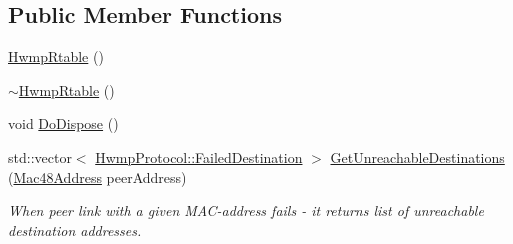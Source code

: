 \subsection*{Public Member Functions}
\begin{DoxyCompactItemize}
\item 
\hyperlink{classns3_1_1dot11s_1_1HwmpRtable_a4b0f3a93997a0308686ba5dee6d5eace}{Hwmp\+Rtable} ()
\item 
\hyperlink{classns3_1_1dot11s_1_1HwmpRtable_a64bd4db0b80a555551dd11f5527a22ee}{$\sim$\+Hwmp\+Rtable} ()
\item 
void \hyperlink{classns3_1_1dot11s_1_1HwmpRtable_a1f8f38d223332a4b95cbad863d809d37}{Do\+Dispose} ()
\item 
std\+::vector$<$ \hyperlink{structns3_1_1dot11s_1_1HwmpProtocol_1_1FailedDestination}{Hwmp\+Protocol\+::\+Failed\+Destination} $>$ \hyperlink{classns3_1_1dot11s_1_1HwmpRtable_aa7b1e562530f1a859ee59aa019570287}{Get\+Unreachable\+Destinations} (\hyperlink{classns3_1_1Mac48Address}{Mac48\+Address} peer\+Address)
\begin{DoxyCompactList}\small\item\em When peer link with a given M\+A\+C-\/address fails -\/ it returns list of unreachable destination addresses. \end{DoxyCompactList}\end{DoxyCompactItemize}
